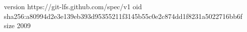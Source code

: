 version https://git-lfs.github.com/spec/v1
oid sha256:a80994d2e3e139eb393d95355211f3145b55c0e2c874dd1f8231a5022716bb6f
size 2009
